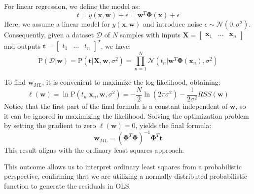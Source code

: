 For linear regression, we define the model as:
\[t=y(\textbf{x},\textbf{w})+\epsilon=\textbf{w}^T\boldsymbol{\Phi}(\textbf{x})+\epsilon\]
Here, we assume a linear model for $y(\textbf{x},\textbf{w})$ and introduce noise  $\epsilon\sim\mathcal{N}(0,\sigma^2)$. 
Consequently, given a dataset $\mathcal{D}$ of $N$ samples with inputs $\textbf{X}=\begin{bmatrix}\textbf{x}_1 & \dots & \textbf{x}_n \end{bmatrix}$ and outputs $\textbf{t}=\begin{bmatrix}t_1 & \dots & t_n \end{bmatrix}^T$, we have: 
\[\text{P}(\mathcal{D}|\textbf{w})=\text{P}(\textbf{t}|\textbf{X},\textbf{w},\sigma^2)=\prod_{n=1}^{N}\mathcal{N}(t_n|\textbf{w}^T\boldsymbol{\Phi}(\textbf{x}_n),\sigma^2)\]
 
To find $\textbf{w}_{ML}$, it is convenient to maximize the log-likelihood, obtaining:
\[\ell (\textbf{w})=\ln\text{P}(t_n|\textbf{x}_n, \textbf{w} ,\sigma^2)=-\dfrac{N}{2}\ln(2\pi\sigma^2)-\dfrac{1}{2\sigma^2}RSS(\textbf{w})\]
Notice that the first part of the final formula is a constant independent of $\textbf{w}$, so it can be ignored in maximizing the likelihood.
Solving the optimization problem by setting the gradient to zero $\ell (\textbf{w})=0$, yields the final formula:
\[\textbf{w}_{ML}=\left( \boldsymbol{\Phi}^T\boldsymbol{\Phi} \right)^{-1}\boldsymbol{\Phi}^T\textbf{t}\]
This result aligns with the ordinary least squares approach.

This outcome allows us to interpret ordinary least squares from a probabilistic perspective, confirming that we are utilizing a normally distributed probabilistic function to generate the residuals in OLS.

